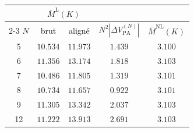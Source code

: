 \begin{tabular}{c c c c c}
    \hline\hline
    & \multicolumn{2}{c}{$\bar M^\text{L}(K)$} & & \\
    \cline{2-3}
    $N$ & brut & aligné & $N^2|\Delta V_\text{PA}^{(N)}|$ & $\bar M^\text{NL}(K)$ \\
    \hline
    5  & $10.534$ & $11.973$ & $1.439$ & $3.100$ \\
    6  & $11.356$ & $13.174$ & $1.818$ & $3.103$ \\
    7  & $10.486$ & $11.805$ & $1.319$ & $3.101$ \\
    8  & $10.734$ & $11.657$ & $0.922$ & $3.101$ \\
    9  & $11.305$ & $13.342$ & $2.037$ & $3.103$ \\
    12 & $11.222$ & $13.913$ & $2.691$ & $3.103$ \\
    \hline\hline
\end{tabular}
